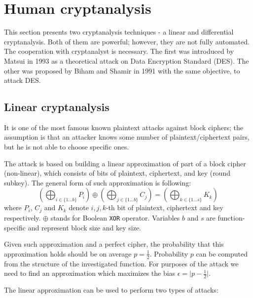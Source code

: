 \documentclass[
    digital,    %
    oneside,    %
    color,
    11pt,
    nocover,
    notable,
    nolof,
    nolot,
    final
]{fithesis3}
\renewcommand\_{\textunderscore\allowbreak}
\begin{document}
\section{Human cryptanalysis}

This section presents two cryptanalysis techniques - a linear and differential cryptanalysis. Both of them are powerful; however, they are not fully automated. The cooperation with cryptanalyst is necessary. The first was introduced by Matsui \cite{matsui1993linear} in 1993 as a theoretical attack on Data Encryption Standard (DES). The other was proposed by Biham and Shamir \cite{Biham1991} in 1991 with the same objective, to attack DES.


\subsection{Linear cryptanalysis}

It is one of the most famous known plaintext attacks against block ciphers; the assumption is that an attacker knows some number of plaintext/ciphertext pairs, but he is not able to choose specific ones. 

The attack is based on building a linear approximation of part of a block cipher (non-linear), which consists of bits of plaintext, ciphertext, and key (round subkey). The general form of such approximation is following: 
\begin{equation}
\left( \bigoplus_{i \in \{1...b\}} P_{i} \right) \oplus \left( \bigoplus_{j \in \{1...b\}} C_{j} \right) = \left( \bigoplus_{k \in \{1...s\}} K_{k} \right)
\label{eq:general_approx}
\end{equation}
where $P_{i}$, $C_{j}$ and $K_{k}$ denote $i,j,k$-th bit of plaintext, ciphertext and key respectively. $\oplus$ stands for Boolean \texttt{XOR} operator. Variables $b$ and $s$ are function-specific and represent block size and key size. \cite{junod2000linear} 

Given such approximation and a perfect cipher, the probability that this approximation holds should be on average $p = \frac{1}{2}$. Probability $p$ can be computed from the structure of the investigated function. For purposes of the attack we need to find an approximation which maximizes the bias $\epsilon = \lvert p - \frac{1}{2} \rvert$. 

The linear approximation can be used to perform two types of attacks:
\end{document}
